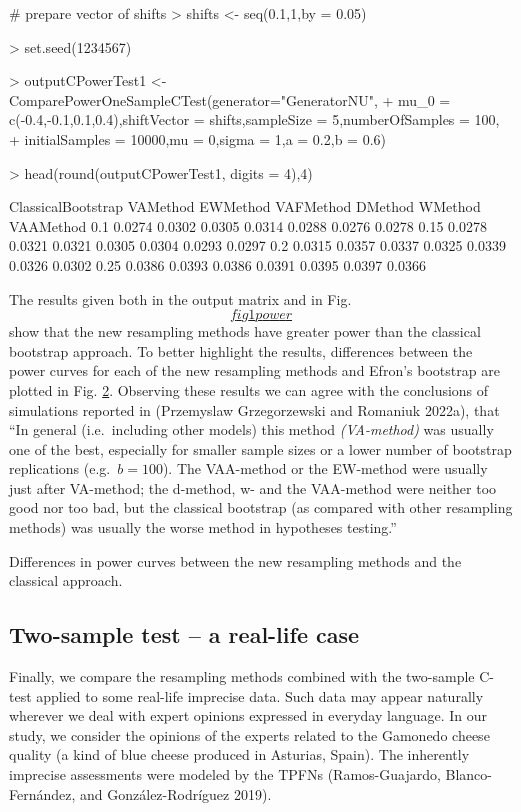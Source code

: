 \begin{example}
\# prepare vector of shifts \textgreater{} shifts \textless- seq(0.1,1,by = 0.05)

\textgreater{} set.seed(1234567)

\textgreater{} outputCPowerTest1 \textless-
ComparePowerOneSampleCTest(generator="GeneratorNU", + mu\_0 =
c(-0.4,-0.1,0.1,0.4),shiftVector = shifts,sampleSize = 5,numberOfSamples
= 100, + initialSamples = 10000,mu = 0,sigma = 1,a = 0.2,b = 0.6)

\textgreater{} head(round(outputCPowerTest1, digits = 4),4)

ClassicalBootstrap VAMethod EWMethod VAFMethod DMethod WMethod VAAMethod
0.1 0.0274 0.0302 0.0305 0.0314 0.0288 0.0276 0.0278 0.15 0.0278 0.0321
0.0321 0.0305 0.0304 0.0293 0.0297 0.2 0.0315 0.0357 0.0337 0.0325
0.0339 0.0326 0.0302 0.25 0.0386 0.0393 0.0386 0.0391 0.0395 0.0397
0.0366
\end{example}

The results given both in the output matrix and in
Fig.~\protect\hyperlink{fig1power}{\[fig1power\]} show that the new resampling methods have greater
power than the classical bootstrap approach. To better highlight the
results, differences between the power curves for each of the new
resampling methods and Efron's bootstrap are plotted in Fig.
\protect\hyperlink{fig2power}{2}. Observing
these results we can agree with the conclusions of simulations reported
in (Przemyslaw Grzegorzewski and Romaniuk 2022a), that ``In general (i.e.~including other
models) this method \emph{(VA-method)} was usually one of the best,
especially for smaller sample sizes or a lower number of bootstrap
replications (e.g.~\(b=100\)). The VAA-method or the EW-method were
usually just after VA-method; the d-method, w- and the VAA-method were
neither too good nor too bad, but the classical bootstrap (as compared
with other resampling methods) was usually the worse method in
hypotheses testing.''

Differences in power curves between the new resampling
methods and the classical approach.

\hypertarget{two-sample-test-a-real-life-case}{%
\subsection{Two-sample test -- a real-life case}\label{two-sample-test-a-real-life-case}}

Finally, we compare the resampling methods combined with the two-sample
C-test applied to some real-life imprecise data. Such data may appear
naturally wherever we deal with expert opinions expressed in everyday
language. In our study, we consider the opinions of the experts related
to the Gamonedo cheese quality (a kind of blue cheese produced in
Asturias, Spain). The inherently imprecise assessments were modeled by
the TPFNs (Ramos-Guajardo, Blanco-Fernández, and González-Rodríguez 2019).

